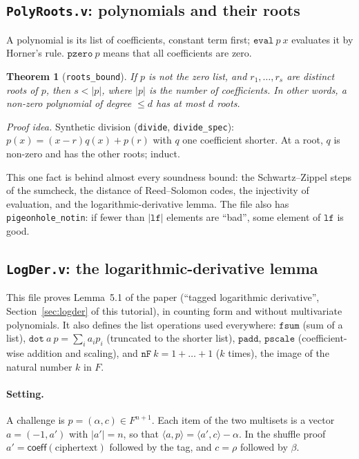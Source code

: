 \documentclass[11pt,a4paper]{article}
\newcommand{\coeff}{\mathsf{coeff}}
\newcommand{\ip}[2]{\langle #1, #2\rangle}
\theoremstyle{definition}
\theoremstyle{plain}
\newtheorem{theorem}[definition]{Theorem}
\begin{document}
\subsection{\texttt{PolyRoots.v}: polynomials and their roots}

A polynomial is its list of coefficients, constant term first; $\mathtt{eval}\ p\ x$ evaluates it
by Horner's rule. $\mathtt{pzero}\ p$ means that all coefficients are zero.

\begin{theorem}[\texttt{roots\_bound}]
If $p$ is not the zero list, and $r_1,\dots,r_s$ are distinct roots of $p$, then $s<|p|$, where
$|p|$ is the number of coefficients. In other words, a non-zero polynomial of degree $\le d$ has at
most $d$ roots.
\end{theorem}
\emph{Proof idea.} Synthetic division (\texttt{divide}, \texttt{divide\_spec}): $p(x)=(x-r)q(x)+p(r)$
with $q$ one coefficient shorter. At a root, $q$ is non-zero and has the other roots; induct.

This one fact is behind almost every soundness bound: the Schwartz--Zippel steps of the sumcheck,
the distance of Reed--Solomon codes, the injectivity of evaluation, and the logarithmic-derivative
lemma. The file also has \texttt{pigeonhole\_notin}: if fewer than $|\mathtt{lf}|$ elements are
``bad'', some element of $\mathtt{lf}$ is good.

\subsection{\texttt{LogDer.v}: the logarithmic-derivative lemma}

This file proves Lemma~5.1 of the paper (``tagged logarithmic derivative'', Section~\ref{sec:logder}
of this tutorial), in counting form and without multivariate polynomials. It also defines the
list operations used everywhere: $\mathtt{fsum}$ (sum of a list), $\mathtt{dot}\ a\ p=\sum_i a_ip_i$
(truncated to the shorter list), $\mathtt{padd}$, $\mathtt{pscale}$ (coefficient-wise addition and
scaling), and $\mathtt{nF}\ k=1+\dots+1$ ($k$ times), the image of the natural number $k$ in $F$.

\paragraph{Setting.} A challenge is $p=(\alpha,c)\in F^{n+1}$. Each item of the two multisets is a
vector $a=(-1,a')$ with $|a'|=n$, so that $\ip{a}{p}=\ip{a'}{c}-\alpha$. In the shuffle proof
$a'=\coeff(\text{ciphertext})$ followed by the tag, and $c=\rho$ followed by $\beta$.
\end{document}

